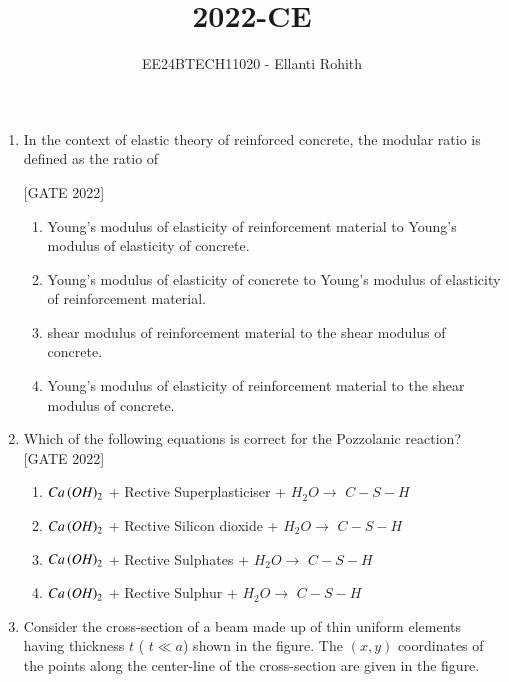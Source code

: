 \documentclass[journal,12pt,onecolumn]{IEEEtran}
\theoremstyle{remark}
\begin{document}

\vspace{3cm}

\title{2022-CE}
\author{EE24BTECH11020 -  Ellanti Rohith}
\maketitle

\renewcommand{\thefigure}{\theenumi}
\renewcommand{\thetable}{\theenumi}

\begin{enumerate}
\item In the context of elastic theory of reinforced concrete, the modular ratio is defined as the ratio of\par \hfill{[GATE 2022]}
\begin{enumerate}

\item Young's modulus of elasticity of reinforcement material to Young's modulus of elasticity of concrete.\vspace{4pt} 
\item Young's modulus of elasticity of concrete to Young's modulus of elasticity of reinforcement material.\vspace{4pt}
\item shear modulus of reinforcement material to the shear modulus of concrete.\vspace{4pt}
\item Young's modulus of elasticity of reinforcement material to the shear modulus of concrete.\vspace{4pt}

\end{enumerate}
\item Which of the following equations is correct for the Pozzolanic reaction?\vspace{4pt}
\hfill{[GATE 2022]}\begin{enumerate}
\item $Ca\left(OH\right)_{2}$ + Rective Superplasticiser + $H_{2}O \rightarrow$ $C-S-H$\vspace{4pt}
\item $Ca\left(OH\right)_{2}$ + Rective Silicon dioxide + $H_{2}O \rightarrow$ $C-S-H$\vspace{4pt}
\item $Ca\left(OH\right)_{2}$ + Rective Sulphates + $H_{2}O \rightarrow$ $C-S-H$\vspace{4pt}
\item $Ca\left(OH\right)_{2}$ + Rective Sulphur + $H_{2}O \rightarrow$ $C-S-H$
\end{enumerate}
\item Consider the cross-section of a beam made up of thin uniform elements having thickness  $ t  $ ( $ t \ll a  $) shown in the figure. The  $(x, y) $ coordinates of the points along the center-line of the cross-section are given in the figure.


\end{enumerate}
\end{document}
